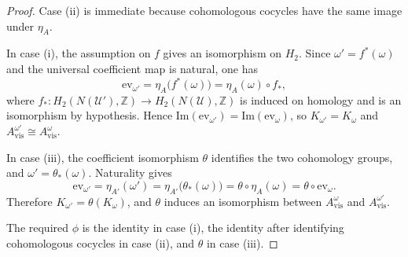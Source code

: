 \begin{proof}
Case \textup{(ii)} is immediate because cohomologous cocycles have the same image under $\eta_A$.

In case \textup{(i)}, the assumption on $f$ gives an isomorphism on $H_2$. Since $\omega'=f^*(\omega)$ and the universal coefficient map is natural, one has
\[
\mathrm{ev}_{\omega'}=\eta_A\bigl(f^*(\omega)\bigr)=\eta_A(\omega)\circ f_*,
\]
where $f_*:H_2(N(\mathcal U'),\mathbb Z)\to H_2(N(\mathcal U),\mathbb Z)$ is induced on homology and is an isomorphism by hypothesis. Hence $\mathrm{Im}(\mathrm{ev}_{\omega'})=\mathrm{Im}(\mathrm{ev}_\omega)$, so $K_{\omega'}=K_{\omega}$ and $A_{\mathrm{vis}}^{\omega'}\cong A_{\mathrm{vis}}^{\omega}$.

In case \textup{(iii)}, the coefficient isomorphism $\theta$ identifies the two cohomology groups, and $\omega'=\theta_*(\omega)$. Naturality gives
\[
\mathrm{ev}_{\omega'}=\eta_{A'}(\omega')=\eta_{A'}\bigl(\theta_*(\omega)\bigr)=\theta\circ \eta_A(\omega)=\theta\circ \mathrm{ev}_\omega.
\]
Therefore $K_{\omega'}=\theta(K_{\omega})$, and $\theta$ induces an isomorphism between $A_{\mathrm{vis}}^\omega$ and $A_{\mathrm{vis}}^{\omega'}$.

The required $\phi$ is the identity in case \textup{(i)}, the identity after identifying cohomologous cocycles in case \textup{(ii)}, and $\theta$ in case \textup{(iii)}.
\end{proof}

